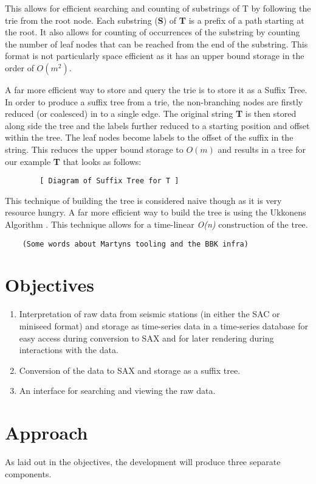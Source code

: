 \documentclass[11pt]{scrartcl}
\begin{document}
	This allows for efficient searching and counting of substrings of T by following the trie from the root node.  Each substring (\textbf{S}) of \textbf{T} is a prefix of a path starting at the root.  It also allows for counting of occurrences of the substring by counting the number of leaf nodes that can be reached from the end of the substring.  This format is not particularly space efficient as it has an upper bound storage in the order of \textit{$O(m^{2})$}.
	
	A far more efficient way to store and query the trie is to store it as a Suffix Tree.  In order to produce a suffix tree from a trie, the non-branching nodes are firstly reduced (or coalesced) in to a single edge.  The original string \textbf{T} is then stored along side the tree and the labels further reduced to a starting position and offset within the tree.  The leaf nodes become labels to the offset of the suffix in the string.  This reduces the upper bound storage to \textit{$O(m)$} and results in a tree for our example \textbf{T} that looks as follows:
	\begin{verbatim}
		[ Diagram of Suffix Tree for T ]
	\end{verbatim}
	
	This technique of building the tree is considered naive though as it is very resource hungry.  A far more efficient way to build the tree is using the Ukkonens Algorithm \citep{ukkonens}.  This technique allows for a time-linear \textit{O(n)} construction of the tree.
	\begin{verbatim}
	(Some words about Martyns tooling and the BBK infra)
	\end{verbatim}

\section{Objectives}
\begin{enumerate}
	\item Interpretation of raw data from seismic stations (in either the SAC or miniseed format) and storage as time-series data in a time-series database for easy access during conversion to SAX and for later rendering during interactions with the data.
	\item Conversion of the data to SAX and storage as a suffix tree.
	\item An interface for searching and viewing the raw data.
\end{enumerate}

\section{Approach}
	As laid out in the objectives, the development will produce three separate components.
	
\end{document}
